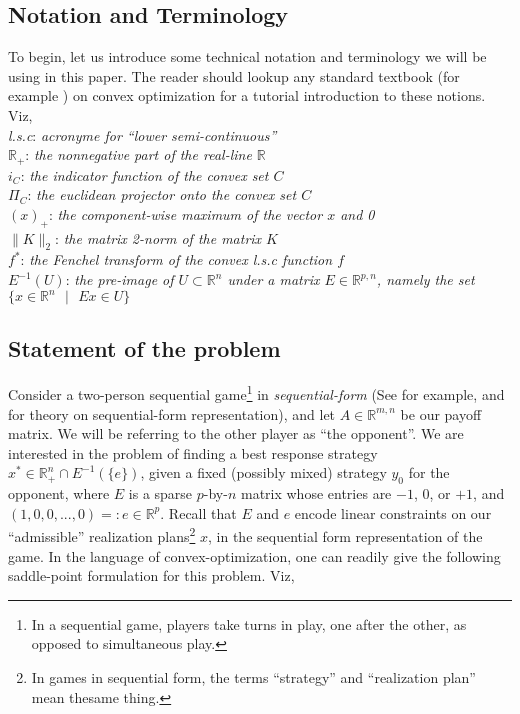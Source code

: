 \documentclass[a4paper,10pt,journal]{IEEEtran}
\begin{document}
\subsection{Notation and Terminology}
To begin, let us introduce some technical notation and terminology we will be using in this paper. The reader should lookup any standard textbook
(for example \cite{boyd2004}) on convex optimization for a tutorial introduction to these notions. Viz,\\
\textit{l.s.c}: \quad \textit{acronyme for ``lower semi-continuous''}\\
$\mathbb{R}_+$: \quad \textit{the nonnegative part of the real-line $\mathbb{R}$}\\
$i_C$: \quad \textit{the indicator function of the convex set $C$}\\
$\Pi_C$: \quad \textit{the euclidean projector onto the convex set $C$}\\
$(x)_+$: \quad \textit{the component-wise maximum of the vector $x$ and 0}\\
$\|K\|_2$: \quad \textit{the matrix 2-norm of the matrix $K$}\\
$f^*$: \quad \textit{the Fenchel transform of the convex l.s.c function $f$}\\
$E^{-1}(U)$: \quad \textit{the pre-image of $U \subset \mathbb{R}^n$ under a matrix $E \in \mathbb{R}^{p,n}$,
namely the set $\{x \in \mathbb{R}^n\text{ }| \text{ }Ex \in U\}$}

\subsection{Statement of the problem}
Consider a two-person sequential game\footnote{In a sequential game, players take turns in play, one after the other,
as opposed to simultaneous play.} in \textit{sequential-form} (See for example, \cite{von1996efficient} and \cite{koller1996efficient} 
for theory on sequential-form representation), and let $A \in \mathbb{R}^{m,n}$ be our payoff matrix.
We will be referring to the other player as ``the opponent''. We are interested in the problem of
finding a best response strategy $x^* \in \mathbb{R}_{+}^n \cap E^{-1}(\{e\})$, given a fixed
(possibly mixed) strategy $y_0$ for the opponent, where $E$ is a sparse $p$-by-$n$ matrix whose entries are $-1$, $0$, or $+1$,
and $(1, 0, 0, ..., 0) =: e \in \mathbb{R}^p$. Recall that $E$ and $e$ encode linear constraints on our ``admissible''
realization plans\footnote{In games in sequential form, the terms ``strategy'' and ``realization plan''
mean thesame thing.} $x$, in the sequential form representation of the game.
In the language of convex-optimization,
one can readily give the following saddle-point formulation for this problem. Viz,
\end{document}
